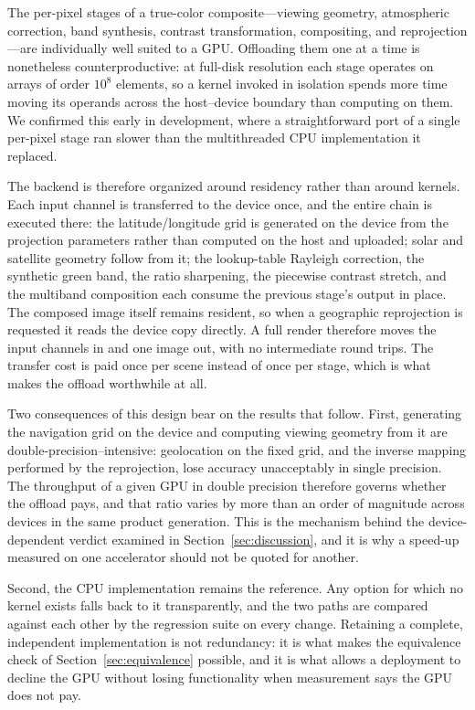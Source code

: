 \documentclass{ametsocV6.1}
\begin{document}
The per-pixel stages of a true-color composite---viewing geometry, atmospheric
correction, band synthesis, contrast transformation, compositing, and
reprojection---are individually well suited to a GPU. Offloading them one at a
time is nonetheless counterproductive: at full-disk resolution each stage
operates on arrays of order $10^{8}$ elements, so a kernel invoked in isolation
spends more time moving its operands across the host--device boundary than
computing on them. We confirmed this early in development, where a
straightforward port of a single per-pixel stage ran slower than the
multithreaded CPU implementation it replaced.

The backend is therefore organized around residency rather than around kernels.
Each input channel is transferred to the device once, and the entire chain is
executed there: the latitude/longitude grid is generated on the device from the
projection parameters rather than computed on the host and uploaded; solar and
satellite geometry follow from it; the lookup-table Rayleigh correction, the
synthetic green band, the ratio sharpening, the piecewise contrast stretch, and
the multiband composition each consume the previous stage's output in place.
The composed image itself remains resident, so when a geographic reprojection
is requested it reads the device copy directly. A full render therefore moves
the input channels in and one image out, with no intermediate round trips. The
transfer cost is paid once per scene instead of once per stage, which is what
makes the offload worthwhile at all.

Two consequences of this design bear on the results that follow. First,
generating the navigation grid on the device and computing viewing geometry
from it are double-precision--intensive: geolocation on the fixed grid, and the
inverse mapping performed by the reprojection, lose accuracy unacceptably in
single precision. The throughput of a given GPU in double precision therefore
governs whether the offload pays, and that ratio varies by more than an order
of magnitude across devices in the same product generation. This is the
mechanism behind the device-dependent verdict examined in
Section~\ref{sec:discussion}, and it is why a speed-up measured on one
accelerator should not be quoted for another.

Second, the CPU implementation remains the reference. Any option for which no
kernel exists falls back to it transparently, and the two paths are compared
against each other by the regression suite on every change. Retaining a
complete, independent implementation is not redundancy: it is what makes the
equivalence check of Section~\ref{sec:equivalence} possible, and it is what
allows a deployment to decline the GPU without losing functionality when
measurement says the GPU does not pay.
\end{document}
